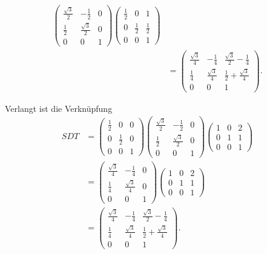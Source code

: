\begin{loesung}
\begin{teilaufgaben}
\begin{align*}
\begin{pmatrix}
\frac{\sqrt{3}}2 & - \frac12        & 0 \\
\frac12          & \frac{\sqrt{3}}2 & 0 \\
      0          &        0         & 1
\end{pmatrix}
\begin{pmatrix}
\frac12 &     0   & 1 \\
    0   & \frac12 & \frac12 \\
    0   &     0   & 1 
\end{pmatrix}
\\
&=
\begin{pmatrix}
\frac{\sqrt{3}}4 & -\frac14        & \frac{\sqrt{3}}2-\frac14 \\
\frac14          &\frac{\sqrt{3}}4 & \frac12+\frac{\sqrt{3}}4 \\
       0         &        0        & 1
\end{pmatrix}.
\end{align*}
\item
Verlangt ist die Verknüpfung
\begin{align*}
SDT
&=
\begin{pmatrix}
\frac12 &     0   & 0 \\
    0   & \frac12 & 0 \\
    0   &     0   & 1 
\end{pmatrix}
\begin{pmatrix}
\frac{\sqrt{3}}2 & - \frac12        & 0 \\
\frac12          & \frac{\sqrt{3}}2 & 0 \\
      0          &        0         & 1
\end{pmatrix}
\begin{pmatrix}
1&0&2\\
0&1&1\\
0&0&1
\end{pmatrix}
\\
&=
\begin{pmatrix}
\frac{\sqrt{3}}4 & - \frac14        & 0 \\
\frac14          & \frac{\sqrt{3}}4 & 0 \\
      0          &        0         & 1
\end{pmatrix}
\begin{pmatrix}
1&0&2\\
0&1&1\\
0&0&1
\end{pmatrix}
\\
&=
\begin{pmatrix}
\frac{\sqrt{3}}4 & -\frac14         & \frac{\sqrt{3}}2-\frac14         \\
\frac14          & \frac{\sqrt{3}}4 & \frac12+\frac{\sqrt{3}}4 \\
0                & 0                & 1
\end{pmatrix}.
\end{align*}
\end{teilaufgaben}
\end{loesung}


